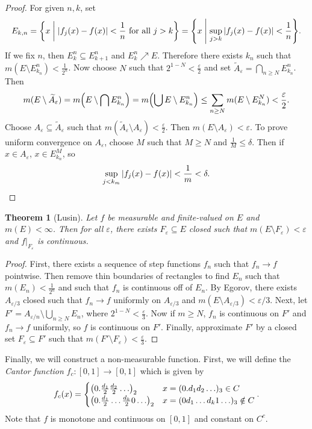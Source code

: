 \documentclass[leqno, openany]{memoir}
\newtheorem{thm}{Theorem}[chapter]
\theoremstyle{definition}
\theoremstyle{remark}
\theoremstyle{plain}
\theoremstyle{definition}
\theoremstyle{remark}
\newcommand{\ep}{\varepsilon}
\newcommand{\wt}[1]{\widetilde{#1}}
\begin{document}
\begin{proof}
    For given $n,k$, set
    \[ E_{k,n} = \qty{x \mathrel{\bigg|} \abs{f_j(x) - f(x)} < \frac{1}{n} \text{ for all } j > k} = \qty{x \mathrel{\Bigg|} \sup_{j>k} \abs{f_j(x) - f(x)} < \frac{1}{n}}. \]
    If we fix $n$, then $E_k^n \subseteq E_{k+1}^n$ and $E_k^n \nearrow E$. Therefore there exists $k_n$ such that $m(E \setminus E_{k_n}^n) < \frac{1}{2^n}$. Now choose $N$ such that $2^{1-N} < \frac{\ep}{2}$ and set $\wt{A}_{\ep} = \bigcap_{n \geq N} E_{k_n}^n$. Then 
    \[ m(E \setminus \wt{A}_{\ep}) = m\qty(E \setminus \bigcap E_{k_n}^n) = m\qty(\bigcup E \setminus E_{k_n}^n) \leq \sum_{n \geq N} m(E \setminus E_{k_n}^N) < \frac{\ep}{2}. \]
    Choose $A_{\ep} \subseteq \wt{A}_{\ep}$ such that $m(\wt{A}_{\ep} \setminus A_{\ep}) < \frac{\ep}{2}$. Then $m(E \setminus A_{\ep}) < \ep$. To prove uniform convergence on $A_{\ep}$, choose $M$ such that $M \geq N$ and $\frac{1}{M} \leq \delta$. Then if $x \in A_{\ep}$, $x \in E_{k_n}^M$, so 
    \[ \sup_{j < k_m} \abs{f_j(x) - f(x)} < \frac{1}{m} < \delta. \qedhere \]
\end{proof}

\begin{thm}[Lusin]
    Let $f$ be measurable and finite-valued on $E$ and $m(E) < \infty$. Then for all $\ep$, there exists $F_{\ep} \subseteq E$ closed such that $m(E \setminus F_{\ep}) < \ep$ and $f |_{F_{\ep}}$ is continuous.
\end{thm}

\begin{proof}
    First, there exists a sequence of step functions $f_n$ such that $f_n \to f$ pointwise. Then remove thin boundaries of rectangles to find $E_n$ such that $m(E_n) < \frac{1}{2^n}$ and such that $f_n$ is continuous off of $E_n$. By Egorov, there exists $A_{\ep/3}$ closed such that $f_n \to f$ uniformly on $A_{\ep/3}$ and $m(E \setminus A_{\ep/3}) < \ep/3$. Next, let $F' = A_{\ep/n} \setminus \bigcup_{n \geq N} E_n$, where $2^{1-N} < \frac{\ep}{3}$. Now if $m \geq N$, $f_n$ is continuous on $F'$ and $f_n \to f$ uniformly, so $f$ is continuous on $F'$. Finally, approximate $F'$ by a closed set $F_{\ep} \subseteq F'$ such that $m(F' \setminus F_{\ep}) < \frac{\ep}{3}$.
\end{proof}

Finally, we will construct a non-measurable function. First, we will define the \textit{Cantor function} $f_c: [0,1] \to [0,1]$ which is given by
\[ f_c(x) = \begin{cases}
    \qty(0.\frac{d_1}{2}\frac{d_2}{2}\ldots)_2 & x = (0.d_1d_2\ldots)_3 \in C \\
    \qty(0.\frac{d_1}{2}\ldots\frac{d_k}{2}0\ldots)_2 & x = (0d_1\ldots d_k 1 \ldots)_3 \notin C
\end{cases}. \]
Note that $f$ is monotone and continuous on $[0,1]$ and constant on $C^c$.
\end{document}
